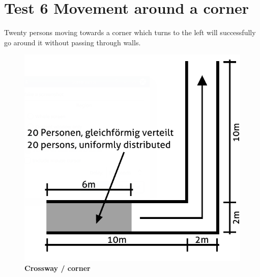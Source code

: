 \section*{Test 6 Movement around a corner}

Twenty persons moving towards a corner which turns to the left will successfully go around it without passing through walls.

\begin{figure}[h]
	\centering
	\includegraphics[scale=0.50]{test_description/Corner_test_6.png}
	\caption{\footnotesize \textbf{Crossway / corner}}
\end{figure}


